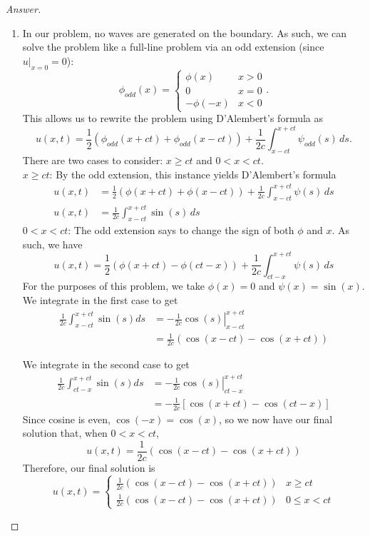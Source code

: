 \documentclass{article}
\theoremstyle{definition}
\renewcommand\qedsymbol{$\blacksquare$}
\newenvironment{ans}{\begin{proof}[Answer]\renewcommand{\qedsymbol}{}}{\end{proof}}
\begin{document}
\begin{ans}
\begin{enumerate}[(1), start=9]
    \item In our problem, no waves are generated on the boundary. As such, we can solve the problem like a full-line problem via an odd extension (since $u|_{x=0} = 0$):
    \[\phi_{odd}(x) = \begin{cases}
        \phi(x) & x > 0\\
        0 & x = 0\\
        -\phi(-x) & x < 0
    \end{cases}.\]
    This allows us to rewrite the problem using D'Alembert's formula as
    \[u(x,t) = \frac{1}{2}(\phi_{odd}(x+ct) + \phi_{odd}(x-ct)) + \frac{1}{2c}\int_{x-ct}^{x+ct}\psi_{odd}(s)\,ds.\]
    There are two cases to consider: $x \geq ct$ and $0 < x < ct$.\\
    \underline{$x \geq ct$}: By the odd extension, this instance yields D'Alembert's formula
    \begin{align*}
        u(x,t) &= \frac{1}{2}(\phi(x+ct) + \phi(x-ct)) + \frac{1}{2c}\int_{x-ct}^{x+ct}\psi(s)\,ds\\
        u(x,t) &= \frac{1}{2c}\int_{x-ct}^{x+ct}\sin{(s)}\,ds
    \end{align*}
    \underline{$0 < x < ct$}: The odd extension says to change the sign of both $\phi$ and $x$. As such, we have
    \[u(x,t) = \frac{1}{2}(\phi(x+ct) - \phi(ct-x)) + \frac{1}{2c}\int_{ct-x}^{x+ct}\psi(s)\,ds\]
    For the purposes of this problem, we take $\phi(x) = 0$ and $\psi(x) = \sin(x)$. We integrate in the first case to get 
    \begin{align*}
        \frac{1}{2c}\int_{x-ct}^{x+ct}\sin(s)ds &= -\left.\frac{1}{2c}\cos(s)\right|_{x-ct}^{x+ct}\\
        &=\frac{1}{2c}(\cos(x-ct) - \cos(x+ct))
    \end{align*}

    We integrate in the second case to get
    \begin{align*}
        \frac{1}{2c}\int_{ct-x}^{x+ct}\sin(s)ds &= -\left.\frac{1}{2c}\cos(s)\right|_{ct-x}^{x+ct}\\
        &= -\frac{1}{2c} [\cos{(x+ct)} - \cos{(ct-x)}]
    \end{align*}
    Since cosine is even, $\cos(-x) = \cos(x)$, so we now have our final solution that, when $0 < x < ct$,
    \[u(x,t) = \frac{1}{2c}(\cos(x-ct) - \cos(x+ct))\]
    Therefore, our final solution is
    \[\boxed{u(x,t) = \begin{cases}
        \frac{1}{2c}(\cos{(x-ct)} - \cos{(x+ct)} ) & x \geq ct\\
        \frac{1}{2c}(\cos{(x-ct)} - \cos{(x+ct)} ) & 0 \leq x < ct
    \end{cases}}\]


\end{enumerate}
\end{ans}
\end{document}
